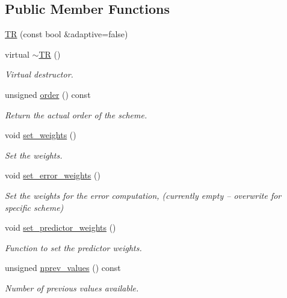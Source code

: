 \subsection*{Public Member Functions}
\begin{DoxyCompactItemize}
\item 
\hyperlink{classoomph_1_1TR_ac83377c97c81b2fa5afbf12c56bbb52f}{TR} (const bool \&adaptive=false)
\item 
virtual \hyperlink{classoomph_1_1TR_a42fe5f88519d9b3645ab99520dc4ea5d}{$\sim$\+TR} ()
\begin{DoxyCompactList}\small\item\em Virtual destructor. \end{DoxyCompactList}\item 
unsigned \hyperlink{classoomph_1_1TR_a007e98e499c2440b05947b626d610425}{order} () const
\begin{DoxyCompactList}\small\item\em Return the actual order of the scheme. \end{DoxyCompactList}\item 
void \hyperlink{classoomph_1_1TR_afa7d2aa82b6a509ce9adc039ca46bacf}{set\+\_\+weights} ()
\begin{DoxyCompactList}\small\item\em Set the weights. \end{DoxyCompactList}\item 
void \hyperlink{classoomph_1_1TR_aa9c84561d7019ca2e610ea8f93be7a73}{set\+\_\+error\+\_\+weights} ()
\begin{DoxyCompactList}\small\item\em Set the weights for the error computation, (currently empty -- overwrite for specific scheme) \end{DoxyCompactList}\item 
void \hyperlink{classoomph_1_1TR_aef78c8db06cbf63829040190dfda04da}{set\+\_\+predictor\+\_\+weights} ()
\begin{DoxyCompactList}\small\item\em Function to set the predictor weights. \end{DoxyCompactList}\item 
unsigned \hyperlink{classoomph_1_1TR_ac9b61bc12fc5657d4d5a0797b0097d38}{nprev\+\_\+values} () const
\begin{DoxyCompactList}\small\item\em Number of previous values available. \end{DoxyCompactList}\item 

\end{DoxyCompactItemize}
